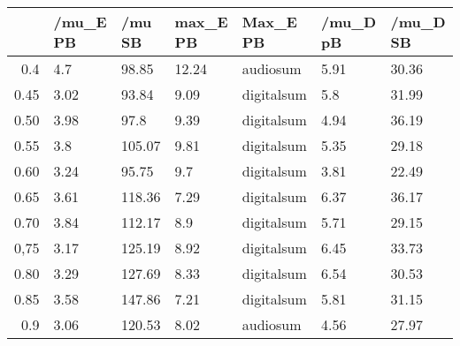 \begin{table}[ht]
\centering
\begin{tabular}{rllllll}
  \hline
 & /mu\_E PB & /mu SB & max\_E PB & Max\_E PB & /mu\_D pB & /mu\_D SB \\ 
  \hline
0.4 & 4.7 & 98.85 & 12.24 & audiosum & 5.91 & 30.36 \\ 
  0.45 & 3.02 & 93.84 & 9.09 & digitalsum & 5.8 & 31.99 \\ 
  0.50 & 3.98 & 97.8 & 9.39 & digitalsum & 4.94 & 36.19 \\ 
  0.55 & 3.8 & 105.07 & 9.81 & digitalsum & 5.35 & 29.18 \\ 
  0.60 & 3.24 & 95.75 & 9.7 & digitalsum & 3.81 & 22.49 \\ 
  0.65 & 3.61 & 118.36 & 7.29 & digitalsum & 6.37 & 36.17 \\ 
  0.70 & 3.84 & 112.17 & 8.9 & digitalsum & 5.71 & 29.15 \\ 
  0,75 & 3.17 & 125.19 & 8.92 & digitalsum & 6.45 & 33.73 \\ 
  0.80 & 3.29 & 127.69 & 8.33 & digitalsum & 6.54 & 30.53 \\ 
  0.85 & 3.58 & 147.86 & 7.21 & digitalsum & 5.81 & 31.15 \\ 
  0.9 & 3.06 & 120.53 & 8.02 & audiosum & 4.56 & 27.97 \\ 
   \hline
\end{tabular}
\end{table}
